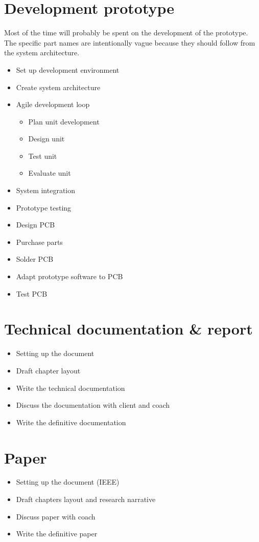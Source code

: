 \section{Development prototype}
Most of the time will probably be spent on the development of the prototype. The specific part names are intentionally vague because they should follow from the system architecture.
\begin{itemize}
    \item Set up development environment
    \item Create system architecture
    \item Agile development loop
    \begin{itemize}
        \item Plan unit development
        \item Design unit
        \item Test unit
        \item Evaluate unit
    \end{itemize}
    \item System integration
    \item Prototype testing
    \item Design PCB
    \item Purchase parts
    \item Solder PCB
    \item Adapt prototype software to PCB
    \item Test PCB
\end{itemize}

\section{Technical documentation \& report}
\begin{itemize}        
    \item Setting up the document
    \item Draft chapter layout
    \item Write the technical documentation
    \item Discuss the documentation with client and coach
    \item Write the definitive documentation
\end{itemize}

\section{Paper}
\begin{itemize}
    \item Setting up the document (IEEE)
    \item Draft chapters layout and research narrative
    \item Discuss paper with coach
    \item Write the definitive paper
\end{itemize}

